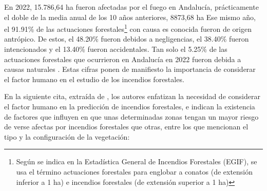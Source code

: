 \documentclass[12pt,a4paper,]{book}
\let\rmarkdownfootnote\footnote%
\def\footnote{\protect\rmarkdownfootnote}
\numberwithin{dummy}{section}
\theoremstyle{ocrenumbox}
\theoremstyle{blacknumex}
\theoremstyle{blacknumbox}
\theoremstyle{ocrenum}
\theoremstyle{ocrenum}
\begin{document}
En 2022, 15.786,64 ha fueron afectadas por el fuego en Andalucía,
prácticamente el doble de la media anual de los 10 años anteriores,
8873,68 ha Ese mismo año, el 91.91\% de las actuaciones
forestales\footnote{Según se indica en la Estadística General de
  Incendios Forestales (EGIF), se usa el término actuaciones forestales
  para englobar a conatos (de extensión inferior a 1 ha) e incendios
  forestales (de extensión superior a 1 ha)} con causa es conocida
fueron de origen antrópico. De estos, el 48.20\% fueron debidos a
negligencias, el 38.40\% fueron intencionados y el 13.40\% fueron
accidentales. Tan solo el 5.25\% de las actuaciones forestales que
ocurrieron en Andalucía en 2022 fueron debida a causas naturales
\citep{INFOCA2022}. Estas cifras ponen de manifiesto la importancia de
considerar el factor humano en el estudio de los incendios forestales.

En la siguiente cita, extraída de \citet{incendioCamCLim}, los autores
enfatizan la necesidad de considerar el factor humano en la predicción
de incendios forestales, e indican la existencia de factores que
influyen en que unas determinadas zonas tengan un mayor riesgo de verse
afectas por incendios forestales que otras, entre los que mencionan el
tipo y la configuración de la vegetación:
\end{document}
